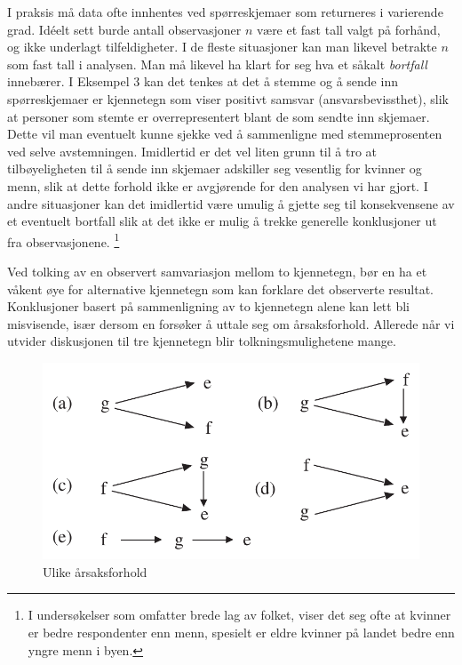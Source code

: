 I praksis må data ofte innhentes ved spørreskjemaer som returneres
i varierende grad.  Id\'{e}elt sett burde antall observasjoner $n$ 
være et fast tall valgt på forhånd, og ikke underlagt
tilfeldigheter.  I de fleste situasjoner kan man likevel betrakte $n$
som fast tall i analysen.  Man må likevel ha klart for seg hva et
såkalt {\em bortfall} innebærer.  I Eksempel 3 kan det tenkes at det
å stemme og å sende inn spørreskjemaer er kjennetegn som
viser positivt samsvar (ansvarsbevissthet), slik at personer som stemte
er overrepresentert blant de som sendte inn skjemaer.  Dette vil man 
eventuelt kunne sjekke ved å sammenligne med stemmeprosenten ved selve
avstemningen.  Imidlertid er det vel liten grunn til å tro at
tilbøyeligheten til å sende inn skjemaer adskiller seg vesentlig
for kvinner og menn, slik at dette forhold ikke er avgjørende for den
analysen vi har gjort. I andre situasjoner kan det imidlertid være 
umulig å gjette seg til konsekvensene av et eventuelt bortfall slik
at det ikke er mulig å trekke generelle konklusjoner ut fra
observasjonene. 
\footnote{I undersøkelser som omfatter brede lag av folket, viser det
seg ofte at kvinner er bedre respondenter enn menn, spesielt er eldre 
kvinner på landet bedre enn yngre menn i byen.}

Ved tolking av en observert samvariasjon mellom to kjennetegn, bør
en ha et våkent øye for alternative kjennetegn som kan forklare
det observerte resultat.  Konklusjoner basert på sammenligning av
to kjennetegn alene kan lett bli misvisende, især dersom en forsøker
å uttale seg om årsaksforhold.  Allerede når vi utvider
diskusjonen til tre kjennetegn blir tolkningsmulighetene mange. 

\begin{figure}[ht]
\centering
  \includegraphics[scale=0.8]{figurer/fig9_1.pdf} 
 \caption{Ulike årsaksforhold}
	\label{fig:aarsaksforhold}
\end{figure}

